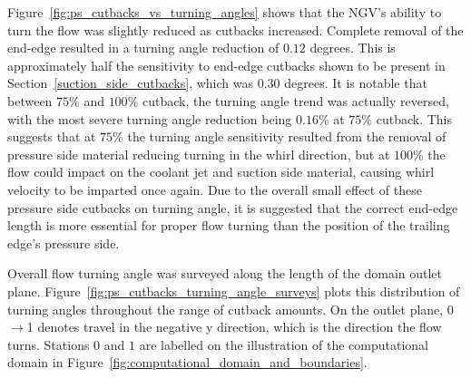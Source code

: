 \documentclass[a4paper, 11pt, oneside]{report}
\begin{document}
Figure~\ref{fig:ps_cutbacks_vs_turning_angles} shows that the NGV's ability to turn the flow was slightly reduced as cutbacks increased. Complete removal of the end-edge resulted in a turning angle reduction of $0.12$ degrees. This is approximately half the sensitivity to end-edge cutbacks shown to be present in Section~\ref{suction_side_cutbacks}, which was $0.30$ degrees. It is notable that between $75\%$ and $100\%$ cutback, the turning angle trend was actually reversed, with the most severe turning angle reduction being $0.16\%$ at $75\%$ cutback. This suggests that at $75\%$ the turning angle sensitivity resulted from the removal of pressure side material reducing turning in the whirl direction, but at $100\%$ the flow could impact on the coolant jet and suction side material, causing whirl velocity to be imparted once again. Due to the overall small effect of these pressure side cutbacks on turning angle, it is suggested that the correct end-edge length is more essential for proper flow turning than the position of the trailing edge's pressure side.

Overall flow turning angle was surveyed along the length of the domain outlet plane. Figure~\ref{fig:ps_cutbacks_turning_angle_surveys} plots this distribution of turning angles throughout the range of cutback amounts. On the outlet plane, 0$\rightarrow$1 denotes travel in the negative y direction, which is the direction the flow turns. Stations $0$ and $1$ are labelled on the illustration of the computational domain in Figure~\ref{fig:computational_domain_and_boundaries}.
\end{document}
